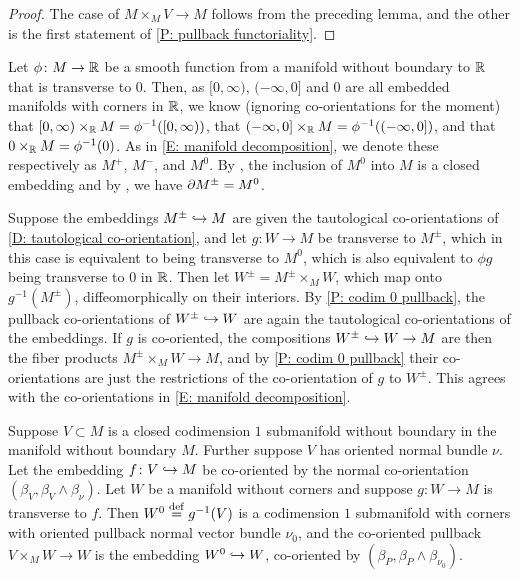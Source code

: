 \begin{proof}
	The case of $M \times_M V \to M$ follows from the preceding lemma, and the other is the first statement of \cref{P: pullback functoriality}.
\end{proof}

\begin{example}\label{E: codim 0 and 1 co-or as fiber products}
	Let $\phi \colon M \to \mathbb{R}$ be a smooth function from a manifold without boundary to $\mathbb{R}$ that is transverse to $0$.
	Then, as $[0, \infty)$, $(-\infty, 0]$ and $0$ are all embedded manifolds with corners in $\mathbb{R}$, we know (ignoring co-orientations for the moment) that $[0,\infty) \times_{\mathbb{R}} M = \phi^{-1}([0,\infty))$, that $(-\infty,0] \times_{\mathbb{R}} M = \phi^{-1}((-\infty,0])$, and that $0 \times_{\mathbb{R}} M = \phi^{-1}(0)$.
	As in \cref{E: manifold decomposition}, we denote these respectively as $M^+$, $M^-$, and $M^0$.
	By \cite[Proposition 4.2.9]{MaDo92}, the inclusion of $M^0$ into $M$ is a closed embedding and by \cite[Proposition 6.7]{Joy12}, we have $\partial M^\pm = M^0$.

	Suppose the embeddings $M^\pm \hookrightarrow M$ are given the tautological co-orientations of \cref{D: tautological co-orientation}, and let $g \colon W \to M$ be transverse to $M^\pm$, which in this case is equivalent to being transverse to $M^0$, which is also equivalent to $\phi g$ being transverse to $0$ in $\mathbb{R}$.
	Then let $W^\pm = M^\pm \times_M W$, which map onto $g^{-1}(M^\pm)$, diffeomorphically on their interiors.
	By \cref{P: codim 0 pullback}, the pullback co-orientations of $W^\pm \hookrightarrow W$ are again the tautological co-orientations of the embeddings.
	If $g$ is co-oriented, the compositions $W^\pm \hookrightarrow W \to M$ are then the fiber products $M^\pm \times_M W \to M$, and by \cref{P: codim 0 pullback} their co-orientations are just the restrictions of the co-orientation of $g$ to $W^\pm$.
	This agrees with the co-orientations in \cref{E: manifold decomposition}.
\end{example}

\begin{proposition}\label{P: codim 1 co-orient}
	Suppose $V \subset M$ is a closed codimension $1$ submanifold without boundary in the manifold without boundary $M$.
	Further suppose $V$ has oriented normal bundle $\nu$.
	Let the embedding $f \colon V \hookrightarrow M$ be co-oriented by the normal co-orientation $(\beta_V, \beta_V \wedge \beta_\nu)$.
	Let $W$ be a manifold without corners and suppose $g \colon W \to M$ is transverse to $f$.
	Then $W^0 \stackrel{\mathrm{def}}{=} g^{-1}(V)$ is a codimension $1$ submanifold with corners with oriented pullback normal vector bundle $\nu_0$, and the co-oriented pullback $V \times_M W \to W$ is the embedding $W^0 \hookrightarrow W$, co-oriented by $(\beta_P, \beta_P \wedge \beta_{\nu_0})$.
\end{proposition}

